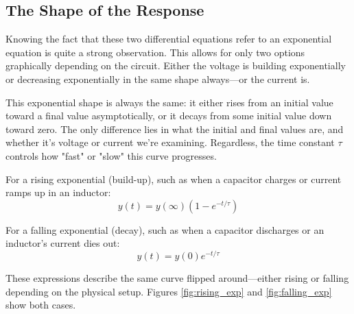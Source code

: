 \documentclass[12pt]{article}
\begin{document}
\subsection{The Shape of the Response}
Knowing the fact that these two differential equations refer to an exponential
equation is quite a strong observation. This allows for only two options
graphically depending on the circuit. Either the voltage is building
exponentially or decreasing exponentially in the same shape always—or the
current is.

This exponential shape is always the same: it either rises from an initial value
toward a final value asymptotically, or it decays from some initial value down
toward zero. The only difference lies in what the initial and final values are,
and whether it’s voltage or current we’re examining. Regardless, the time
constant $\tau$ controls how "fast" or "slow" this curve progresses.

For a rising exponential (build-up), such as when a capacitor charges or current
ramps up in an inductor:
\[
	y(t) = y(\infty) \left(1 - e^{-t/\tau}\right)
\]

For a falling exponential (decay), such as when a capacitor discharges or an
inductor’s current dies out:
\[
	y(t) = y(0) e^{-t/\tau}
\]

These expressions describe the same curve flipped around—either rising or
falling depending on the physical setup. Figures \ref{fig:rising_exp} and
\ref{fig:falling_exp} show both cases.
\end{document}
